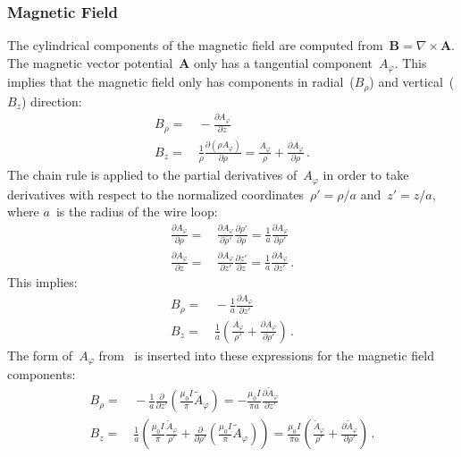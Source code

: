 \subsubsection{Magnetic Field}
The cylindrical components of the magnetic field are computed from~$\mathbf{B} = \nabla \times \mathbf{A}$.
The magnetic vector potential~$\mathbf{A}$ only has a tangential component~$A_\varphi$.
This implies that the magnetic field only has components in radial~($B_\rho$) and vertical~($B_z$) direction:
\begin{align}
  B_\rho =&\, - \frac{\partial A_\varphi}{\partial z} \\
  B_z    =&\, \frac{1}{\rho} \frac{\partial \left(\rho A_\varphi\right)}{\partial \rho}
         =    \frac{A_\varphi}{\rho} + \frac{\partial A_\varphi}{\partial \rho} \, .
\end{align}
The chain rule is applied to the partial derivatives of~$A_\varphi$
in order to take derivatives with respect to the normalized coordinates~$\rho'=\rho/a$ and~$z'=z/a$,
where $a$~is the radius of the wire loop:
\begin{align}
      \frac{\partial A_\varphi}{\partial \rho}
 =&\, \frac{\partial A_\varphi}{\partial \rho'} \frac{\partial \rho'}{\partial \rho}
 =    \frac{1}{a} \frac{\partial A_\varphi}{\partial \rho'} \\
      \frac{\partial A_\varphi}{\partial z}
 =&\, \frac{\partial A_\varphi}{\partial z'} \frac{\partial z'}{\partial z}
 =    \frac{1}{a} \frac{\partial A_\varphi}{\partial z'} \, .
\end{align}
This implies:
\begin{align}
  B_\rho =&\, - \frac{1}{a} \frac{\partial A_\varphi}{\partial z'} \\
  B_z    =&\, \frac{1}{a} \left( \frac{A_\varphi}{\rho'} + \frac{\partial A_\varphi}{\partial \rho'} \right) \, .
\end{align}
The form of~$A_\varphi$ from~ is inserted into these expressions
for the magnetic field components:
\begin{align}
  B_\rho =&\, - \frac{1}{a} \frac{\partial}{\partial z'} \left( \frac{\mu_0 I}{\pi} \tilde{A}_\varphi \right)
         =    - \frac{\mu_0 I}{\pi a} \frac{\partial \tilde{A}_\varphi}{\partial z'} \\
  B_z    =&\, \frac{1}{a} \left( \frac{\mu_0 I}{\pi} \frac{\tilde{A}_\varphi}{\rho'} + \frac{\partial}{\partial \rho'} \left( \frac{\mu_0 I}{\pi} \tilde{A}_\varphi \right) \right)
         =    \frac{\mu_0 I}{\pi a} \left(\frac{\tilde{A}_\varphi}{\rho'} + \frac{\partial \tilde{A}_\varphi}{\partial \rho'} \right) \, .
\end{align}
